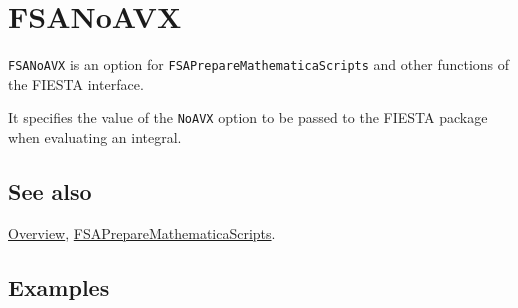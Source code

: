 \documentclass[../FeynHelpersManual.tex]{subfiles}
\begin{document}
\hypertarget{fsanoavx}{
\section{FSANoAVX}\label{fsanoavx}}

\texttt{FSANoAVX} is an option for \texttt{FSAPrepareMathematicaScripts}
and other functions of the FIESTA interface.

It specifies the value of the \texttt{NoAVX} option to be passed to the
FIESTA package when evaluating an integral.

\subsection{See also}

\hyperlink{toc}{Overview},
\hyperlink{fsapreparemathematicascripts}{FSAPrepareMathematicaScripts}.

\subsection{Examples}
\end{document}
